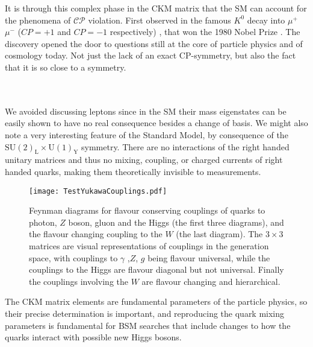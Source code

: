 It is through this complex phase in the CKM matrix that the SM can account for the phenomena of $\mathcal{CP}$ violation. First observed in the famous $K^0$ decay into $\mu^+$ $\mu^-$ ($CP=+1$ and $CP=-1$ respectively) \cite{PhysRevLett.13.138}, that won the 1980 Nobel Prize \cite{NobelPrize:1980-Physics}. The discovery opened the door to questions still at the core of particle physics and of cosmology today. Not just the lack of an exact CP-symmetry, but also the fact that it is so close to a symmetry.
\\ \ \\ \ 
\begin{comment}
\begin{figure}[H]
    \resizebox{200pt}
	\centering
	\large
	\begin{fmffile}{feyngraph_2}
  	\begin{fmfgraph*}(175,60)
    \fmfstraight
    \fmfleft{i2,K,i1}
    \fmfright{o2,o1}
    \fmf{fermion}{i1,t1}
    \fmf{fermion}{t4,i2}
    \fmf{phantom,tension=1}{t1,t2}
    \fmf{phantom,tension=1}{t4,t3}
    \fmf{fermion,tension=1}{t2,o1}
    \fmf{fermion,tension=1}{o2,t3}
    \fmf{boson,tension=0,label=$\text{W}^-$,label.side=left}{t1,t2}
    \fmf{boson,tension=0,label=$\text{W}^+$,label.side=left}{t3,t4}
    \fmf{fermion,tension=0,label=u}{t1,t4}
    \fmf{fermion,tension=0,label=$\nu_\mu$}{t3,t2}
    \fmfv{d.shape=circle,d.size=4,l=$\sin\theta_\text{C}\quad$,l.a=110}{t1}
    \fmfv{d.shape=circle,d.size=4,l=$\cos\theta_\text{C}\quad$,l.a=-110}{t4}
  \end{fmfgraph*}
\end{fmffile}
	\caption{Box diagram describing $K_L^0\rightarrow\mu^-\mu^+$, through an intermediate $u$ quark.}
	\label{fig:Kaon}
\end{figure}
%
\end{comment} 
We avoided discussing leptons since in the SM their mass eigenstates can be easily shown to have no real consequence besides a change of basis. 
%
We might also note a very interesting feature of the Standard Model, by consequence of the $\mathrm{SU(2)_L \times U(1)_Y }$ symmetry. There are no interactions of the right handed unitary matrices and thus no mixing, coupling, or charged currents of right handed quarks, making them theoretically invisible to measurements.  
%
\begin{figure}[H]
	\centering
	\texttt{[image: TestYukawaCouplings.pdf]}
	\caption{Feynman diagrams for flavour conserving couplings of quarks to photon, $Z$ boson, gluon and the Higgs (the first three diagrams), and the flavour changing coupling to the $W$ (the last diagram). The $3\times3$ matrices are visual representations of couplings in the generation space, with couplings to $\gamma$ ,$Z$, $g$ being flavour universal, while the couplings to the Higgs are flavour diagonal but not universal. Finally the couplings involving the $W$ are flavour changing and hierarchical.}
	\label{fig:QuarkCKM}
\end{figure}
The CKM matrix elements are fundamental parameters of the particle physics, so their precise determination is important, and reproducing the quark mixing parameters is fundamental for BSM searches that include changes to how the quarks interact with possible new Higgs bosons. 
